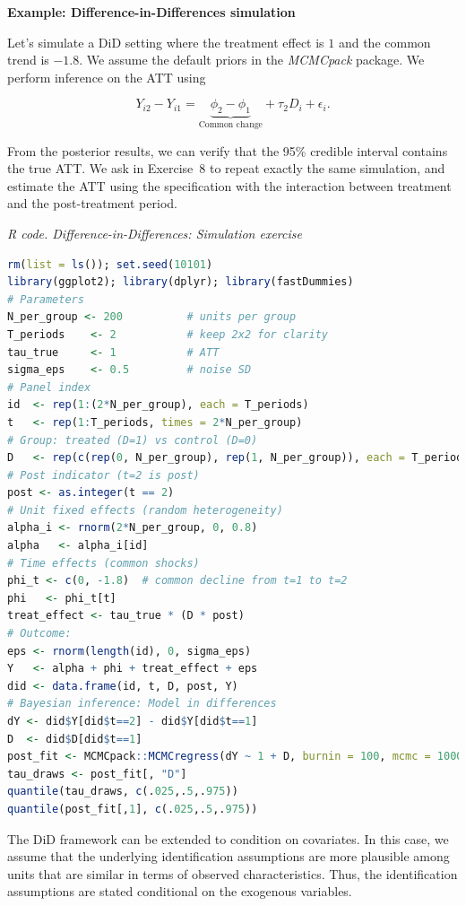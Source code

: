 \textbf{Example: Difference-in-Differences simulation}

Let's simulate a DiD setting where the treatment effect is $1$ and the common trend is $-1.8$. We assume the default priors in the \textit{MCMCpack} package. We perform inference on the ATT using

\[
Y_{i2} - Y_{i1}
= \underbrace{\phi_2 - \phi_1}_{\text{Common change}}
+ \tau_2 D_i + \epsilon_i.
\]

From the posterior results, we can verify that the 95\% credible interval contains the true ATT. We ask in Exercise~8 to repeat exactly the same simulation, and estimate the ATT using the specification with the interaction between treatment and the post-treatment period.

\begin{tcolorbox}[enhanced,width=4.67in,center upper,
	fontupper=\large\bfseries,drop shadow southwest,sharp corners]
	\textit{R code. Difference-in-Differences: Simulation exercise}
	\begin{VF}
		\begin{lstlisting}[language=R]		
rm(list = ls()); set.seed(10101)
library(ggplot2); library(dplyr); library(fastDummies)
# Parameters
N_per_group <- 200          # units per group
T_periods    <- 2           # keep 2x2 for clarity
tau_true     <- 1           # ATT
sigma_eps    <- 0.5         # noise SD
# Panel index
id  <- rep(1:(2*N_per_group), each = T_periods)
t   <- rep(1:T_periods, times = 2*N_per_group)
# Group: treated (D=1) vs control (D=0)
D   <- rep(c(rep(0, N_per_group), rep(1, N_per_group)), each = T_periods)
# Post indicator (t=2 is post)
post <- as.integer(t == 2)
# Unit fixed effects (random heterogeneity)
alpha_i <- rnorm(2*N_per_group, 0, 0.8)
alpha   <- alpha_i[id]
# Time effects (common shocks)
phi_t <- c(0, -1.8)  # common decline from t=1 to t=2
phi   <- phi_t[t]
treat_effect <- tau_true * (D * post)
# Outcome:
eps <- rnorm(length(id), 0, sigma_eps)
Y   <- alpha + phi + treat_effect + eps
did <- data.frame(id, t, D, post, Y)
# Bayesian inference: Model in differences
dY <- did$Y[did$t==2] - did$Y[did$t==1]
D  <- did$D[did$t==1]
post_fit <- MCMCpack::MCMCregress(dY ~ 1 + D, burnin = 100, mcmc = 1000)
tau_draws <- post_fit[, "D"]
quantile(tau_draws, c(.025,.5,.975))
quantile(post_fit[,1], c(.025,.5,.975))
\end{lstlisting}
	\end{VF}
\end{tcolorbox}  
 

The DiD framework can be extended to condition on covariates. In this case, we assume that the underlying identification assumptions are more plausible among units that are similar in terms of observed characteristics. Thus, the identification assumptions are stated conditional on the exogenous variables.

